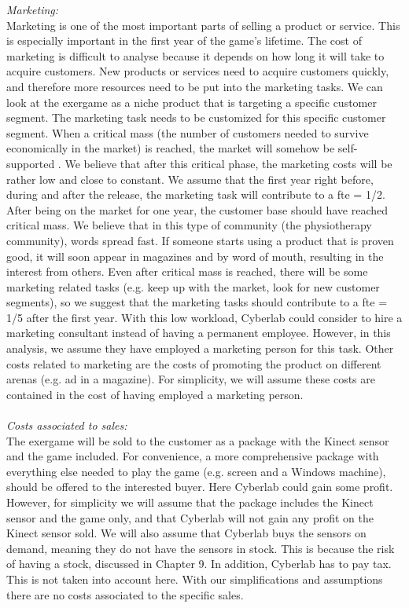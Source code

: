 \emph{Marketing:}\\
Marketing is one of the most important parts of selling a product or service. This is especially important in the first year of the game's lifetime. The cost of marketing is difficult to analyse because it depends on how long it will take to acquire customers. New products or services need to acquire customers quickly, and therefore more resources need to be put into the marketing tasks. We can look at the exergame as a niche product that is targeting a specific customer segment. The marketing task needs to be customized for this specific customer segment. When a critical mass (the number of customers needed to survive economically in the market) is reached, the market will somehow be self-supported \cite{informationrules}. We believe that after this critical phase, the marketing costs will be rather low and close to constant. We assume that the first year right before, during and after the release, the marketing task will contribute to a \ac{fte} = 1/2. After being on the market for one year, the customer base should have reached critical mass.  We believe that in this type of community (the physiotherapy community), words spread fast. If someone starts using a product that is proven good, it will soon appear in magazines and by word of mouth, resulting in the interest from others. Even after critical mass is reached, there will be some marketing related tasks (e.g. keep up with the market, look for new customer segments), so we suggest that the marketing tasks should contribute to a \ac{fte} = 1/5 after the first year. With this low workload, Cyberlab could consider to hire a marketing consultant instead of having a permanent employee. However, in this analysis, we assume they have employed a marketing person for this task. Other costs related to marketing are the costs of promoting the product on different arenas (e.g. ad in a magazine). For simplicity, we will assume these costs are contained in the cost of having employed a marketing person. \\ \\
\emph{Costs associated to sales:}\\
The exergame will be sold to the customer as a package with the Kinect sensor and the game included. For convenience, a more comprehensive package with everything else needed to play the game (e.g. screen and a Windows machine), should be offered to the interested buyer. Here Cyberlab could gain some profit. However, for simplicity we will assume that the package includes the Kinect sensor and the game only, and that Cyberlab will not gain any profit on the Kinect sensor sold. We will also assume that Cyberlab buys the sensors on demand, meaning they do not have the sensors in stock. This is because the risk of having a stock, discussed in Chapter 9. In addition, Cyberlab has to pay tax. This is not taken into account here. With our simplifications and assumptions there are no costs associated to the specific sales. \\ \\
